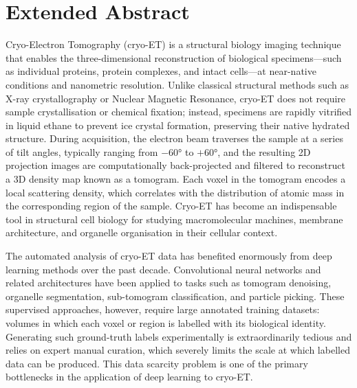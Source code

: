 

\chapter*{Extended Abstract}

Cryo-Electron Tomography (cryo-ET) is a structural biology imaging technique that enables the
three-dimensional reconstruction of biological specimens—such as individual proteins, protein
complexes, and intact cells—at near-native conditions and nanometric resolution. Unlike classical
structural methods such as X-ray crystallography or Nuclear Magnetic Resonance, cryo-ET does not
require sample crystallisation or chemical fixation; instead, specimens are rapidly vitrified in
liquid ethane to prevent ice crystal formation, preserving their native hydrated structure. During
acquisition, the electron beam traverses the sample at a series of tilt angles, typically ranging
from $-60°$ to $+60°$, and the resulting 2D projection images are computationally back-projected
and filtered to reconstruct a 3D density map known as a tomogram. Each voxel in the tomogram
encodes a local scattering density, which correlates with the distribution of atomic mass in the
corresponding region of the sample. Cryo-ET has become an indispensable tool in structural cell
biology for studying macromolecular machines, membrane architecture, and organelle organisation
in their cellular context.

The automated analysis of cryo-ET data has benefited enormously from deep learning methods over
the past decade. Convolutional neural networks and related architectures have been applied to tasks
such as tomogram denoising, organelle segmentation, sub-tomogram classification, and particle
picking. These supervised approaches, however, require large annotated training datasets: volumes
in which each voxel or region is labelled with its biological identity. Generating such ground-truth
labels experimentally is extraordinarily tedious and relies on expert manual curation, which
severely limits the scale at which labelled data can be produced. This data scarcity problem is
one of the primary bottlenecks in the application of deep learning to cryo-ET.

